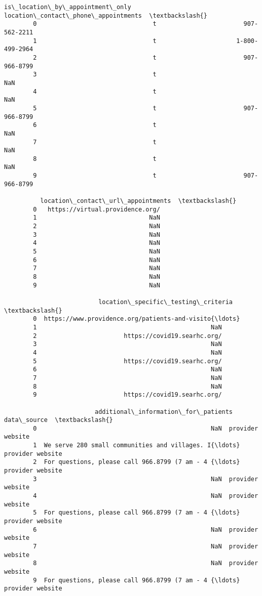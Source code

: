 \documentclass[11pt]{article}
\begin{document}
\begin{Verbatim}[commandchars=\\\{\}]
           is\_location\_by\_appointment\_only location\_contact\_phone\_appointments  \textbackslash{}
        0                                t                        907-562-2211   
        1                                t                      1-800-499-2964   
        2                                t                        907-966-8799   
        3                                t                                 NaN   
        4                                t                                 NaN   
        5                                t                        907-966-8799   
        6                                t                                 NaN   
        7                                t                                 NaN   
        8                                t                                 NaN   
        9                                t                        907-966-8799   
        
          location\_contact\_url\_appointments  \textbackslash{}
        0   https://virtual.providence.org/   
        1                               NaN   
        2                               NaN   
        3                               NaN   
        4                               NaN   
        5                               NaN   
        6                               NaN   
        7                               NaN   
        8                               NaN   
        9                               NaN   
        
                          location\_specific\_testing\_criteria  \textbackslash{}
        0  https://www.providence.org/patients-and-visito{\ldots}   
        1                                                NaN   
        2                        https://covid19.searhc.org/   
        3                                                NaN   
        4                                                NaN   
        5                        https://covid19.searhc.org/   
        6                                                NaN   
        7                                                NaN   
        8                                                NaN   
        9                        https://covid19.searhc.org/   
        
                         additional\_information\_for\_patients       data\_source  \textbackslash{}
        0                                                NaN  provider website   
        1  We serve 280 small communities and villages. I{\ldots}  provider website   
        2  For questions, please call 966.8799 (7 am - 4 {\ldots}  provider website   
        3                                                NaN  provider website   
        4                                                NaN  provider website   
        5  For questions, please call 966.8799 (7 am - 4 {\ldots}  provider website   
        6                                                NaN  provider website   
        7                                                NaN  provider website   
        8                                                NaN  provider website   
        9  For questions, please call 966.8799 (7 am - 4 {\ldots}  provider website   
        

\end{Verbatim}
\end{document}
